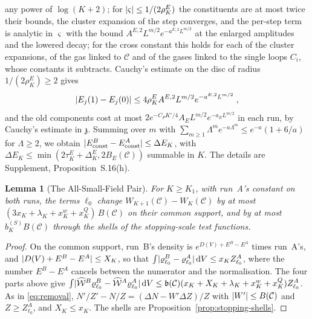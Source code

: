 \documentclass[11pt]{preprint}
\newcommand{\dd}{\mathrm{d}}
\DeclarePairedDelimiter{\abs}{\lvert}{\rvert}
\numberwithin{equation}{section}
\newtheorem{lemma}[theorem]{Lemma}
\theoremstyle{definition}
\theoremstyle{remark}
\theoremstyle{plain}
\begin{document}
any power of $\log(K + 2)$; for $\abs{\varsigma} \leq 1/(2\rho^E_K)$ the constituents are at most twice their bounds, the cluster expansion of the step converges, and the per-step term is analytic in $\varsigma$ with the bound $A^{E,2}L^{m/2}e^{-a^{E,2}L^{m/2}}$ at the enlarged amplitudes and the lowered decay; for the cross constant this holds for each of the cluster expansions, of the gas linked to $\mathcal C$ and of the gases linked to the single loops $C_i$, whose constants it subtracts. Cauchy's estimate on the disc of radius $1/(2\rho^E_K) \geq 2$ gives
\begin{equation}\label{eq:loop-constant-difference}
    \abs{E_j(1) - E_j(0)} \leq 4\rho^E_KA^{E,2}L^{m/2}e^{-a^{E,2}L^{m/2}}\;,
\end{equation}
and the old components cost at most $2e^{-C_PK'/4}A_EL^{m/2}e^{-a_EL^{m/2}}$ in each run, by Cauchy's estimate in $\mathfrak z$. Summing over $m$ with $\sum_{m \geq 1}\Lambda^me^{-a\Lambda^m} \leq e^{-a}(1 + 6/a)$ for $\Lambda \geq 2$, we obtain $\abs{E^B_{\mathrm{const}} - E^A_{\mathrm{const}}} \leq \Delta E_K$, with $\Delta E_K \leq \min(2\tau^E_K + \Delta^E_K, 2B_E(\mathcal C))$ summable in $K$. The details are Supplement, Proposition~S.16(h).

\begin{lemma}[The All-Small-Field Pair]\label{lem:trivial-pair}
For $K \geq K_1$, with run~A's constant on both runs, the terms $\ell_0$ change $W_{K+1}(\mathcal C) - W_K(\mathcal C)$ by at most $(3x_K + \lambda_K + x^w_K + x^Q_K)\,B(\mathcal C)$ on their common support, and by at most $b^{(S)}_KB(\mathcal C)$ through the shells of the stopping-scale test functions.
\end{lemma}

\begin{proof}
On the common support, run~B's density is $e^{D(V) + E^B - E^A}$ times run~A's, and $\abs{D(V) + E^B - E^A} \leq X_K$, so that $\int\abs{\varrho^B_{\ell_0} - \varrho^A_{\ell_0}}\,\dd V \leq x_KZ^A_{\ell_0}$, where the number $E^B - E^A$ cancels between the numerator and the normalisation. The four parts above give $\int\abs{\widehat{\mathcal W}^B\varrho^B_{\ell_0} - \widehat{\mathcal W}^A\varrho^A_{\ell_0}}\,\dd V \leq \mathfrak b(\mathcal C)(x_K + X_K + \lambda_K + x^w_K + x^Q_K)Z^A_{\ell_0}$. As in \eqref{eq:removal}, $N'/Z' - N/Z = (\Delta N - W'\Delta Z)/Z$ with $\abs{W'} \leq B(\mathcal C)$ and $Z \geq Z^A_{\ell_0}$, and $X_K \leq x_K$. The shells are Proposition~\ref{prop:stopping-shells}.
\end{proof}
\end{document}
